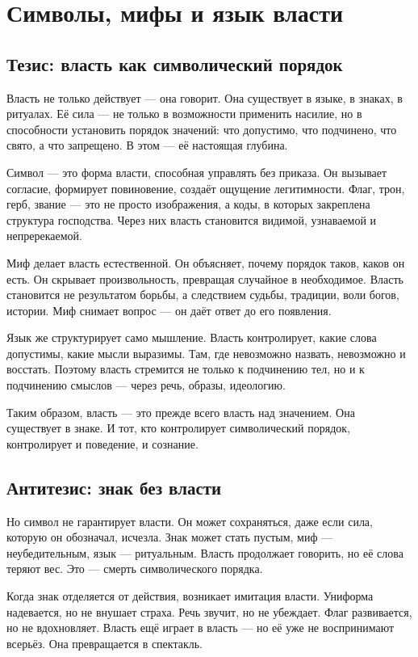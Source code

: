 \chapter{Символы, мифы и язык власти}

\section{Тезис: власть как символический порядок}

Власть не только действует — она говорит. Она существует в языке, в знаках, в ритуалах. Её сила — не только в возможности применить насилие, но в способности установить порядок значений: что допустимо, что подчинено, что свято, а что запрещено. В этом — её настоящая глубина.

Символ — это форма власти, способная управлять без приказа. Он вызывает согласие, формирует повиновение, создаёт ощущение легитимности. Флаг, трон, герб, звание — это не просто изображения, а коды, в которых закреплена структура господства. Через них власть становится видимой, узнаваемой и непререкаемой.

Миф делает власть естественной. Он объясняет, почему порядок таков, каков он есть. Он скрывает произвольность, превращая случайное в необходимое. Власть становится не результатом борьбы, а следствием судьбы, традиции, воли богов, истории. Миф снимает вопрос — он даёт ответ до его появления.

Язык же структурирует само мышление. Власть контролирует, какие слова допустимы, какие мысли выразимы. Там, где невозможно назвать, невозможно и восстать. Поэтому власть стремится не только к подчинению тел, но и к подчинению смыслов — через речь, образы, идеологию.

Таким образом, власть — это прежде всего власть над значением. Она существует в знаке. И тот, кто контролирует символический порядок, контролирует и поведение, и сознание.

\section{Антитезис: знак без власти}

Но символ не гарантирует власти. Он может сохраняться, даже если сила, которую он обозначал, исчезла. Знак может стать пустым, миф — неубедительным, язык — ритуальным. Власть продолжает говорить, но её слова теряют вес. Это — смерть символического порядка.

Когда знак отделяется от действия, возникает имитация власти. Униформа надевается, но не внушает страха. Речь звучит, но не убеждает. Флаг развивается, но не вдохновляет. Власть ещё играет в власть — но её уже не воспринимают всерьёз. Она превращается в спектакль.

